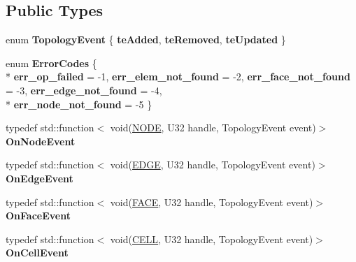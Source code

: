 \subsection*{Public Types}
\begin{DoxyCompactItemize}
\item 
\hypertarget{classps_1_1elastic_1_1VolMesh_a8010471b44f64a1fe41ed63ff34a8305}{}enum {\bfseries Topology\+Event} \{ {\bfseries te\+Added}, 
{\bfseries te\+Removed}, 
{\bfseries te\+Updated}
 \}\label{classps_1_1elastic_1_1VolMesh_a8010471b44f64a1fe41ed63ff34a8305}

\item 
\hypertarget{classps_1_1elastic_1_1VolMesh_ae90aa791da6481aa8dc6ec612c2c3d49}{}enum {\bfseries Error\+Codes} \{ \\*
{\bfseries err\+\_\+op\+\_\+failed} = -\/1, 
{\bfseries err\+\_\+elem\+\_\+not\+\_\+found} = -\/2, 
{\bfseries err\+\_\+face\+\_\+not\+\_\+found} = -\/3, 
{\bfseries err\+\_\+edge\+\_\+not\+\_\+found} = -\/4, 
\\*
{\bfseries err\+\_\+node\+\_\+not\+\_\+found} = -\/5
 \}\label{classps_1_1elastic_1_1VolMesh_ae90aa791da6481aa8dc6ec612c2c3d49}

\item 
\hypertarget{classps_1_1elastic_1_1VolMesh_a2f2e69c7d7143e28ffcc4e06d90eda64}{}typedef std\+::function$<$ void(\hyperlink{classps_1_1elastic_1_1NODE}{N\+O\+D\+E}, U32 handle, Topology\+Event event)$>$ {\bfseries On\+Node\+Event}\label{classps_1_1elastic_1_1VolMesh_a2f2e69c7d7143e28ffcc4e06d90eda64}

\item 
\hypertarget{classps_1_1elastic_1_1VolMesh_addf9d9903c724cee6cd52e91fa5eeab2}{}typedef std\+::function$<$ void(\hyperlink{classps_1_1elastic_1_1EDGE}{E\+D\+G\+E}, U32 handle, Topology\+Event event)$>$ {\bfseries On\+Edge\+Event}\label{classps_1_1elastic_1_1VolMesh_addf9d9903c724cee6cd52e91fa5eeab2}

\item 
\hypertarget{classps_1_1elastic_1_1VolMesh_ac159aebf39215c8db149130b0bc2dd4d}{}typedef std\+::function$<$ void(\hyperlink{classps_1_1elastic_1_1FACE}{F\+A\+C\+E}, U32 handle, Topology\+Event event)$>$ {\bfseries On\+Face\+Event}\label{classps_1_1elastic_1_1VolMesh_ac159aebf39215c8db149130b0bc2dd4d}

\item 
\hypertarget{classps_1_1elastic_1_1VolMesh_a32e38574a3f9c8aa259669becffb689d}{}typedef std\+::function$<$ void(\hyperlink{classps_1_1elastic_1_1CELL}{C\+E\+L\+L}, U32 handle, Topology\+Event event)$>$ {\bfseries On\+Cell\+Event}\label{classps_1_1elastic_1_1VolMesh_a32e38574a3f9c8aa259669becffb689d}

\end{DoxyCompactItemize}
